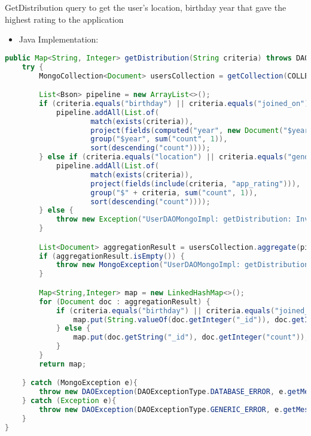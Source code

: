 GetDistribution query to get the user's location, birthday year that gave the highest rating to the application
\begin{itemize}
    \item Java Implementation:
\end{itemize}
\begin{mdframed}[style=customstyle]
\begin{lstlisting}[language=java]
public Map<String, Integer> getDistribution(String criteria) throws DAOException {
    try {
        MongoCollection<Document> usersCollection = getCollection(COLLECTION_NAME);

        List<Bson> pipeline = new ArrayList<>();
        if (criteria.equals("birthday") || criteria.equals("joined_on")) {
            pipeline.addAll(List.of(
                    match(exists(criteria)),
                    project(fields(computed("year", new Document("$year", "$" + criteria)), include("app_rating" ))),
                    group("$year", sum("count", 1)),
                    sort(descending("count"))));
        } else if (criteria.equals("location") || criteria.equals("gender")) {
            pipeline.addAll(List.of(
                    match(exists(criteria)),
                    project(fields(include(criteria, "app_rating"))),
                    group("$" + criteria, sum("count", 1)),
                    sort(descending("count"))));
        } else {
            throw new Exception("UserDAOMongoImpl: getDistribution: Invalid criteria");
        }

        List<Document> aggregationResult = usersCollection.aggregate(pipeline).into(new ArrayList<>());
        if (aggregationResult.isEmpty()) {
            throw new MongoException("UserDAOMongoImpl: getDistribution: No data found");
        }

        Map<String,Integer> map = new LinkedHashMap<>();
        for (Document doc : aggregationResult) {
            if (criteria.equals("birthday") || criteria.equals("joined_on")) {
                map.put(String.valueOf(doc.getInteger("_id")), doc.getInteger("count"));
            } else {
                map.put(doc.getString("_id"), doc.getInteger("count"));
            }
        }
        return map;

    } catch (MongoException e){
        throw new DAOException(DAOExceptionType.DATABASE_ERROR, e.getMessage());
    } catch (Exception e){
        throw new DAOException(DAOExceptionType.GENERIC_ERROR, e.getMessage());
    }
}\end{lstlisting}
\end{mdframed}

